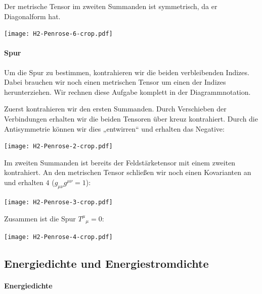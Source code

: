 Der metrische Tensor im zweiten Summanden ist symmetrisch, da er Diagonalform
hat.
\begin{center}
	\texttt{[image: H2-Penrose-6-crop.pdf]}
\end{center}

\paragraph{Spur}

Um die Spur zu bestimmen, kontrahieren wir die beiden verbleibenden Indizes.
Dabei brauchen wir noch einen metrischen Tensor um einen der Indizes
herunterziehen. Wir rechnen diese Aufgabe komplett in der Diagrammnotation.

Zuerst kontrahieren wir den ersten Summanden. Durch Verschieben der
Verbindungen erhalten wir die beiden Tensoren über kreuz kontrahiert. Durch die
Antisymmetrie können wir dies „entwirren“ und erhalten das Negative:
\begin{center}
	\texttt{[image: H2-Penrose-2-crop.pdf]}
\end{center}

Im zweiten Summanden ist bereits der Feldstärketensor mit einem zweiten
kontrahiert. An den metrischen Tensor schließen wir noch einen Kovarianten an
und erhalten $4$ ($g_{\mu\nu} g^{\mu\nu} = 1$):
\begin{center}
	\texttt{[image: H2-Penrose-3-crop.pdf]}
\end{center}

Zusammen ist die Spur $T^\mu{}_\mu = 0$:
\begin{center}
	\texttt{[image: H2-Penrose-4-crop.pdf]}
\end{center}

\subsection{Energiedichte und Energiestromdichte}

\paragraph{Energiedichte}

